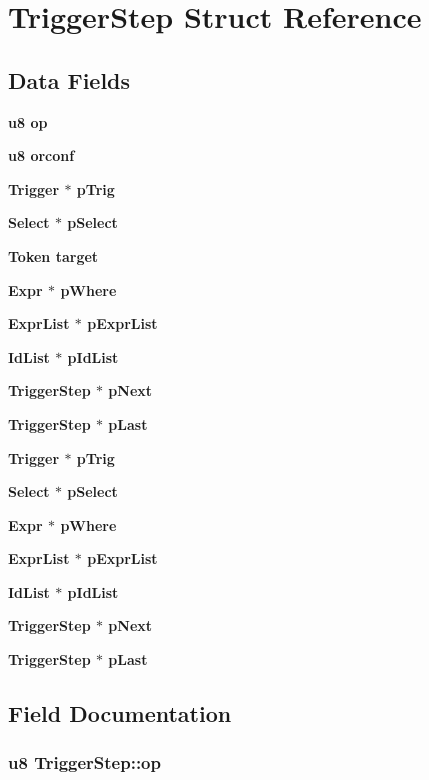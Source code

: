 \section{Trigger\-Step Struct Reference}
\label{structTriggerStep}
\subsection*{Data Fields}
\begin{CompactItemize}
\item 
\bf{u8} \bf{op}
\item 
\bf{u8} \bf{orconf}
\item 
\bf{Trigger} $\ast$ \bf{p\-Trig}
\item 
\bf{Select} $\ast$ \bf{p\-Select}
\item 
\bf{Token} \bf{target}
\item 
\bf{Expr} $\ast$ \bf{p\-Where}
\item 
\bf{Expr\-List} $\ast$ \bf{p\-Expr\-List}
\item 
\bf{Id\-List} $\ast$ \bf{p\-Id\-List}
\item 
\bf{Trigger\-Step} $\ast$ \bf{p\-Next}
\item 
\bf{Trigger\-Step} $\ast$ \bf{p\-Last}
\item 
\bf{Trigger} $\ast$ \bf{p\-Trig}
\item 
\bf{Select} $\ast$ \bf{p\-Select}
\item 
\bf{Expr} $\ast$ \bf{p\-Where}
\item 
\bf{Expr\-List} $\ast$ \bf{p\-Expr\-List}
\item 
\bf{Id\-List} $\ast$ \bf{p\-Id\-List}
\item 
\bf{Trigger\-Step} $\ast$ \bf{p\-Next}
\item 
\bf{Trigger\-Step} $\ast$ \bf{p\-Last}
\end{CompactItemize}


\subsection{Field Documentation}
\subsubsection{\setlength{\rightskip}{0pt plus 5cm}\bf{u8} \bf{Trigger\-Step::op}}\label{structTriggerStep_3910c7210edb83c43c4fa88523207282}


